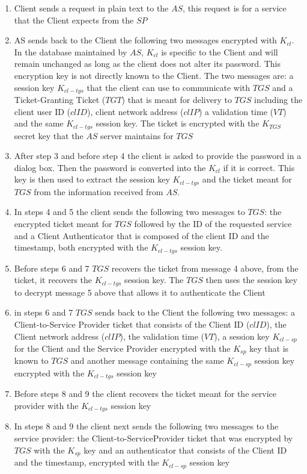 \begin{enumerate}
	\item Client sends a request in plain text to the $AS$, this request is for a service that the Client expects from the $SP$
	\item AS sends back to the Client the following two messages encrypted with $K_{cl}$. In the database maintained by $AS$, $K_{cl}$ is specific to the Client and will remain unchanged as long as the client does not alter its password. This encryption key is not directly known to the Client. The two messages are: a session key $K_{cl-tgs}$ that the client can use to communicate with $TGS$ and a Ticket-Granting Ticket ($TGT$) that is meant for delivery to $TGS$ including the client user ID ($clID$), client network address ($clIP$) a validation time ($VT$) and the same $K_{cl-tgs}$ session key. The ticket is encrypted with the $K_{TGS}$ secret key that the $AS$ server maintains for $TGS$
	\item After step 3 and before step 4 the client is asked to provide the password in a dialog box. Then the password is converted into the $K_{cl}$ if it is correct. This key is then used to extract the session key $K_{cl-tgs}$ and the ticket meant for $TGS$ from the information received from $AS$.
	\item In steps 4 and 5 the client sends the following two messages to $TGS$: the encrypted ticket meant for $TGS$ followed by the ID of the requested service and a Client Authenticator that is composed of the client ID and the timestamp, both encrypted with the $K_{cl-tgs}$ session key.
	\item Before steps 6 and 7 $TGS$ recovers the ticket from message 4 above, from the ticket, it recovers the $K_{cl-tgs}$ session key. The $TGS$ then uses the session key to decrypt message 5 above that allows it to authenticate the Client
	\item in steps 6 and 7 $TGS$ sends back to the Client the following two messages: a Client-to-Service Provider ticket that consists of the Client ID ($clID$), the Client network address ($clIP$), the validation time ($VT$), a session key $K_{cl-sp}$ for the Client and the Service Provider encrypted with the $K_{sp}$ key that is known to $TGS$ and another message containing the same $K_{cl-sp}$ session key encrypted with the $K_{cl-tgs}$ session key
	\item Before steps 8 and 9 the client recovers the ticket meant for the service provider with the $K_{cl-tgs}$ session key
	\item In steps 8 and 9 the client next sends the following two messages to the service provider: the Client-to-ServiceProvider ticket that was encrypted by $TGS$ with the $K_{sp}$ key and an authenticator that consists of the Client ID and the timestamp, encrypted with the $K_{cl-sp}$ session key

\end{enumerate}
